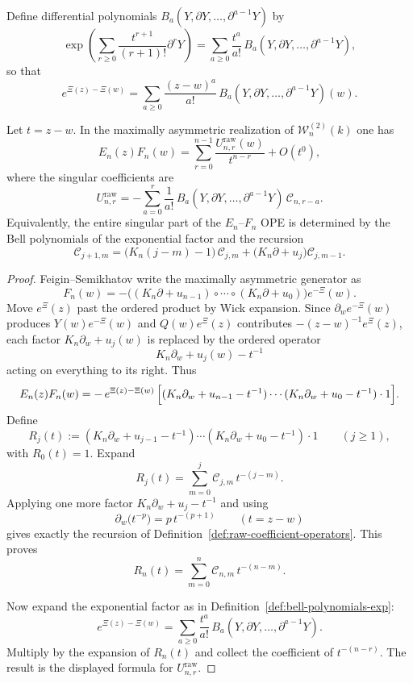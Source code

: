 \begin{definition}
\label{def:bell-polynomials-exp}
Define differential polynomials $B_a(Y,\partial Y,\dots,\partial^{a-1}Y)$ by
\[
\exp\!\left(
\sum_{r\geq 0}\frac{t^{r+1}}{(r+1)!}\partial^r Y
\right)
=
\sum_{a\geq 0}\frac{t^a}{a!}\,B_a(Y,\partial Y,\dots,\partial^{a-1}Y),
\]
so that
\[
e^{\Xi(z)-\Xi(w)}
=
\sum_{a\geq 0}
\frac{(z-w)^a}{a!}\,
B_a(Y,\partial Y,\dots,\partial^{a-1}Y)(w).
\]
\end{definition}

\begin{theorem}
\label{thm:full-raw-coefficient-packet}
Let $t=z-w$.  In the maximally asymmetric realization of
$\mathcal W_n^{(2)}(k)$ one has
\[
E_n(z)F_n(w)
=
\sum_{r=0}^{n-1}\frac{U_{n,r}^{\mathrm{raw}}(w)}{t^{n-r}}
+ O(t^0),
\]
where the singular coefficients are
\[
U_{n,r}^{\mathrm{raw}}
=
-
\sum_{a=0}^{r}
\frac{1}{a!}\,
B_a(Y,\partial Y,\dots,\partial^{a-1}Y)\,
\mathcal C_{n,r-a}.
\]
Equivalently, the entire singular part of the $E_n$--$F_n$ OPE is determined
by the Bell polynomials of the exponential factor and the recursion
\[
\mathcal C_{j+1,m}
=
\bigl(K_n(j-m)-1\bigr)\,\mathcal C_{j,m}
+
\bigl(K_n\partial + u_j\bigr)\mathcal C_{j,m-1}.
\]
\end{theorem}

\begin{proof}
Feigin--Semikhatov write the maximally asymmetric generator as
\[
F_n(w)=-\bigl((K_n\partial + u_{n-1})\circ\cdots\circ(K_n\partial+u_0)\bigr)e^{-\Xi}(w).
\]
Move $e^{\Xi}(z)$ past the ordered product by Wick expansion.  Since
$\partial_w e^{-\Xi}(w)$ produces $Y(w)e^{-\Xi}(w)$ and
$Q(w)e^{\Xi}(z)$ contributes $-(z-w)^{-1}e^{\Xi}(z)$, each factor
$K_n\partial_w+u_j(w)$ is replaced by the ordered operator
\[
K_n\partial_w + u_j(w) - t^{-1}
\]
acting on everything to its right.  Thus
\[
E_n(z)F_n(w)
=
-\,e^{\Xi(z)-\Xi(w)}\,
\Bigl[(K_n\partial_w+u_{n-1}-t^{-1})\cdots(K_n\partial_w+u_0-t^{-1})\cdot 1\Bigr].
\]
Define
\[
R_j(t):=(K_n\partial_w+u_{j-1}-t^{-1})\cdots(K_n\partial_w+u_0-t^{-1})\cdot 1
\qquad (j\geq 1),
\]
with $R_0(t)=1$.  Expand
\[
R_j(t)=\sum_{m=0}^j \mathcal C_{j,m}\,t^{-(j-m)}.
\]
Applying one more factor $K_n\partial_w+u_j-t^{-1}$ and using
\[
\partial_w \bigl(t^{-p}\bigr)= p\,t^{-(p+1)}
\qquad (t=z-w)
\]
gives exactly the recursion of
Definition~\ref{def:raw-coefficient-operators}.  This proves
\[
R_n(t)=\sum_{m=0}^n \mathcal C_{n,m}\,t^{-(n-m)}.
\]

Now expand the exponential factor as in
Definition~\ref{def:bell-polynomials-exp}:
\[
e^{\Xi(z)-\Xi(w)}
=
\sum_{a\geq 0}
\frac{t^a}{a!}\,
B_a(Y,\partial Y,\dots,\partial^{a-1}Y).
\]
Multiply by the expansion of $R_n(t)$ and collect the coefficient of
$t^{-(n-r)}$.  The result is the displayed formula for
$U_{n,r}^{\mathrm{raw}}$.
\end{proof}

